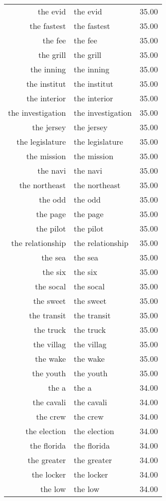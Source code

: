 \begin{table}[ht]
\begin{tabular}{rlr}
  the evid & the evid & 35.00 \\ 
  the fastest & the fastest & 35.00 \\ 
  the fee & the fee & 35.00 \\ 
  the grill & the grill & 35.00 \\ 
  the inning & the inning & 35.00 \\ 
  the institut & the institut & 35.00 \\ 
  the interior & the interior & 35.00 \\ 
  the investigation & the investigation & 35.00 \\ 
  the jersey & the jersey & 35.00 \\ 
  the legislature & the legislature & 35.00 \\ 
  the mission & the mission & 35.00 \\ 
  the navi & the navi & 35.00 \\ 
  the northeast & the northeast & 35.00 \\ 
  the odd & the odd & 35.00 \\ 
  the page & the page & 35.00 \\ 
  the pilot & the pilot & 35.00 \\ 
  the relationship & the relationship & 35.00 \\ 
  the sea & the sea & 35.00 \\ 
  the six & the six & 35.00 \\ 
  the socal & the socal & 35.00 \\ 
  the sweet & the sweet & 35.00 \\ 
  the transit & the transit & 35.00 \\ 
  the truck & the truck & 35.00 \\ 
  the villag & the villag & 35.00 \\ 
  the wake & the wake & 35.00 \\ 
  the youth & the youth & 35.00 \\ 
  the a & the a & 34.00 \\ 
  the cavali & the cavali & 34.00 \\ 
  the crew & the crew & 34.00 \\ 
  the election & the election & 34.00 \\ 
  the florida & the florida & 34.00 \\ 
  the greater & the greater & 34.00 \\ 
  the locker & the locker & 34.00 \\ 
  the low & the low & 34.00 \\ 

\end{tabular}
\end{table}
